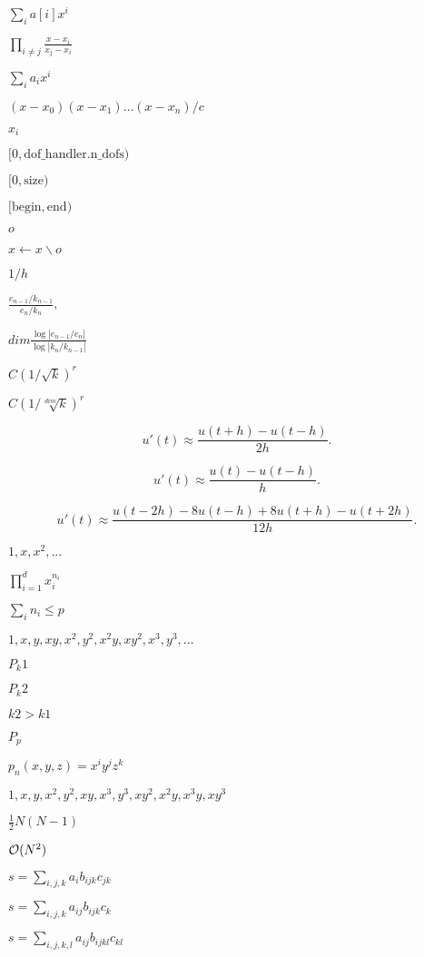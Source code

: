 \documentclass{article}
\begin{document}
$\sum_i a[i] x^i$
\pagebreak

$\prod_{i\neq j} \frac{x-x_i}{x_j-x_i}$
\pagebreak

$\sum_i a_i x^i$
\pagebreak

$(x-x_0) (x-x_1) \ldots (x-x_n)/c$
\pagebreak

$x_i$
\pagebreak

$[0,\text{dof\_handler.n\_dofs})$
\pagebreak

$[0,\text{size})$
\pagebreak

$[\text{begin},\text{end})$
\pagebreak

$o$
\pagebreak

$x \leftarrow x \backslash o$
\pagebreak

$1/h$
\pagebreak

$ \frac{e_{n-1}/k_{n-1}}{e_n/k_n}, $
\pagebreak

$ dim \frac{\log |e_{n-1}/e_{n}|}{\log |k_n/k_{n-1}|} $
\pagebreak

$ C (1/\sqrt{k})^r $
\pagebreak

$ C (1/\sqrt[dim]{k})^r $
\pagebreak

\[ u'(t) \approx \frac{u(t+h) - u(t-h)}{2h}. \]
\pagebreak

\[ u'(t) \approx \frac{u(t) - u(t-h)}{h}. \]
\pagebreak

\[ u'(t) \approx \frac{u(t-2h) - 8u(t-h) + 8u(t+h) - u(t+2h)}{12h}. \]
\pagebreak

${1,x,x^2,...}$
\pagebreak

$\prod_{i=1}^d x_i^{n_i}$
\pagebreak

$\sum_i n_i\leq p$
\pagebreak

${1,x,y,xy,x^2,y^2,x^2y,xy^2,x^3,y^3,...}$
\pagebreak

$P_k1$
\pagebreak

$P_k2$
\pagebreak

$k2>k1$
\pagebreak

$P_p$
\pagebreak

$p_n(x,y,z)=x^i y^j z^k$
\pagebreak

$1,x,y,x^2,y^2,xy,x^3,y^3,xy^2,x^2y,x^3y,xy^3$
\pagebreak

$\frac 12 N (N-1)$
\pagebreak

${\cal O}(N^2)$
\pagebreak

$s=\sum_{i,j,k} a_{i}b_{ijk}c_{jk}$
\pagebreak

$s=\sum_{i,j,k} a_{ij}b_{ijk}c_{k}$
\pagebreak

$s=\sum_{i,j,k,l} a_{ij}b_{ijkl}c_{kl}$
\pagebreak
\end{document}
